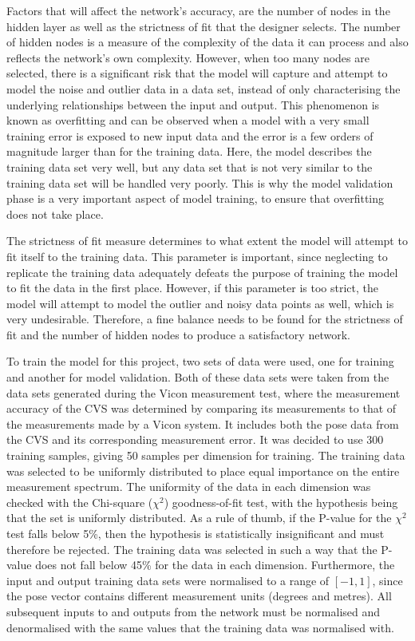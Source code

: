 Factors that will affect the network's accuracy, are the number of nodes in the hidden layer as well as the strictness of fit that the designer selects. The number of hidden nodes is a measure of the complexity of the data it can process and also reflects the network's own complexity. However, when too many nodes are selected, there is a significant risk that the model will capture and attempt to model the noise and outlier data in a data set, instead of only characterising the underlying relationships between the input and output. This phenomenon is known as overfitting and can be observed when a model with a very small training error is exposed to new input data and the error is a few orders of magnitude larger than for the training data. Here, the model describes the training data set very well, but any data set that is not very similar to the training data set will be handled very poorly. This is why the model validation phase is a very important aspect of model training, to ensure that overfitting does not take place. 

The strictness of fit measure determines to what extent the model will attempt to fit itself to the training data. This parameter is important, since neglecting to replicate the training data adequately defeats the purpose of training the model to fit the data in the first place. However, if this parameter is too strict, the model will attempt to model the outlier and noisy data points as well, which is very undesirable. Therefore, a fine balance needs to be found for the strictness of fit and the number of hidden nodes to produce a satisfactory network.  

To train the model for this project, two sets of data were used, one for training and another for model validation. Both of these data sets were taken from the data sets generated during the Vicon measurement test, where the measurement accuracy of the CVS was determined by comparing its measurements to that of the measurements made by a Vicon system. It includes both the pose data from the CVS and its corresponding measurement error. It was decided to use 300 training samples, giving 50 samples per dimension for training. The training data was selected to be uniformly distributed to place equal importance on the entire measurement spectrum. The uniformity of the data in each dimension was checked with the Chi-square ($\chi^2$) goodness-of-fit test, with the hypothesis being that the set is uniformly distributed. As a rule of thumb, if the P-value for the $\chi^2$ test falls below 5\%, then the hypothesis is statistically insignificant and must therefore be rejected. The training data was selected in such a way that the P-value does not fall below 45\% for the data in each dimension. Furthermore, the input and output training data sets were normalised to a range of $[-1, 1]$, since the pose vector contains different measurement units (degrees and metres). All subsequent inputs to and outputs from the network must be normalised and denormalised with the same values that the training data was normalised with.  

